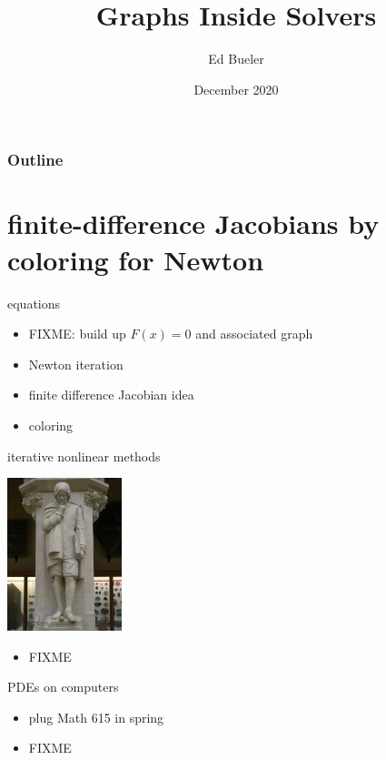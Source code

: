 \documentclass[10pt,hyperref,dvipsnames]{beamer}
\title{Graphs Inside Solvers}
\author{Ed Bueler}
\institute[UAF]{University of Alaska Fairbanks}
\date{December 2020}
\begin{document}
\beamertemplatenavigationsymbolsempty

\begin{frame}
  \maketitle
\end{frame}

\begin{frame}
  \frametitle{Outline}
  \tableofcontents[hideallsubsections]
\end{frame}


\section{finite-difference Jacobians by coloring for Newton}


\begin{frame}{equations}

\begin{itemize}
\item FIXME: build up $F(x)=0$ and associated graph
\item Newton iteration
\item finite difference Jacobian idea
\item coloring
\end{itemize}
\end{frame}


\begin{frame}{iterative nonlinear methods}

\hfill \includegraphics[width=0.25\textwidth]{figs/people/inewton.jpg}

\vspace{-20mm}
\begin{itemize}
\item FIXME
\end{itemize}
\end{frame}


\begin{frame}{PDEs on computers}

\begin{itemize}
\item plug Math 615 in spring
\item FIXME
\end{itemize}
\end{frame}
\end{document}
